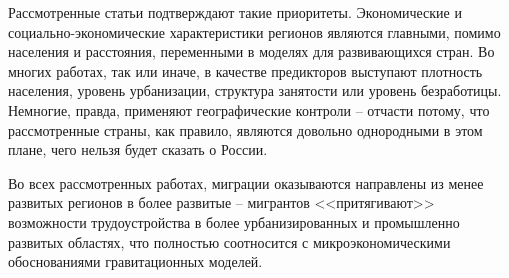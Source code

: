 \documentclass[a4paper,12pt]{article}
\begin{document}
Рассмотренные статьи подтверждают такие приоритеты. Экономические и социально-экономические характеристики регионов являются главными, помимо населения и расстояния, переменными в моделях для развивающихся стран. Во многих работах, так или иначе, в качестве предикторов выступают плотность населения, уровень урбанизации, структура занятости или уровень безработицы. Немногие, правда, применяют географические контроли -- отчасти потому, что рассмотренные страны, как правило, являются довольно однородными в этом плане, чего нельзя будет сказать о России.

Во всех рассмотренных работах, миграции оказываются направлены из менее развитых регионов в более развитые -- мигрантов <<притягивают>> возможности трудоустройства в более урбанизированных и промышленно развитых областях, что полностью соотносится с микроэкономическими обоснованиями гравитационных моделей.

\end{document}
